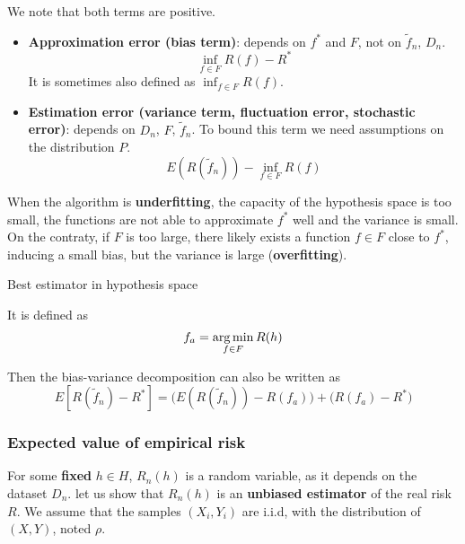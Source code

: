 \documentclass[
10pt, %
a4paper, %
oneside, %
headinclude,footinclude, %
BCOR5mm, %
]{scrartcl}
\begin{document}
We note that both terms are positive.

\begin{itemize}
    \item \textbf{{Approximation error (bias term)}}: depends on $f^*$ and $F$, not on $ \tilde{f}_n$, $D_n$.
	\begin{equation*}
	    \inf_{f\in F}R(f)-R^*
	\end{equation*}
	It is sometimes also defined as $\inf_{f\in F}R(f)$.
    \item \textbf{{Estimation error (variance term, fluctuation error, stochastic error)}}: depends on $D_n$, $F$, $ \tilde{f}_n$. To bound this term we need assumptions on the distribution $P$.
	\begin{equation*}
	    E(R( \tilde{f}_n))- \inf_{f\in F}R(f)
	\end{equation*}
\end{itemize}


When the algorithm is \textbf{{underfitting}}, the capacity of the hypothesis space is too small, the functions are not able to approximate $f^*$ well and the variance is small. On the contraty, if $F$ is too large, there likely exists a function $f\in F$ close to $f^*$, inducing a small bias, but the variance is large (\textbf{{overfitting}}).

\begin{remark}

\begin{definition}{Best estimator in hypothesis space}

    It is defined as
    \begin{equation*}
	f_a = \operatorname*{arg\,min}_{f\in F}R(h)
    \end{equation*}
\end{definition}

    Then the bias-variance decomposition can also be written as
\begin{equation*}
    E[R( \tilde{f}_n)-R^*] = \Big(E(R( \tilde{f}_n))- R(f_a)\Big) +\Big(R(f_a)-R^* \Big)
\end{equation*}
\end{remark}

\subsubsection{\large\color{Periwinkle}Expected value of empirical risk}

For some \textbf{{fixed}} $h\in H$, $R_n(h)$ is a random variable, as it depends on the dataset $D_n$. let us show that $ R_n(h)$ is an \textbf{{unbiased estimator}} of the real risk $R$. We assume that the samples $(X_i, Y_i)$ are i.i.d, with the distribution of $(X,Y)$, noted $\rho$. 
\end{document}
